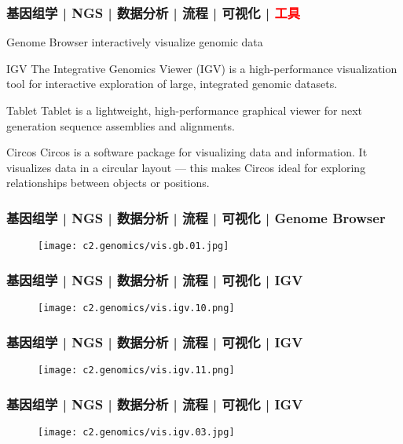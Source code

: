 \begin{frame}
  \frametitle{基因组学 | NGS | 数据分析 | 流程 | 可视化 | \textcolor{red}{工具}}
  \begin{block}{Genome Browser}
    interactively visualize genomic data
  \end{block}
  \pause
  \begin{block}{IGV}
    The Integrative Genomics Viewer (IGV) is a high-performance visualization tool for interactive exploration of large, integrated genomic datasets.
  \end{block}
  \pause
  \begin{block}{Tablet}
    Tablet is a lightweight, high-performance graphical viewer for next generation sequence assemblies and alignments.
  \end{block}
  \pause
  \begin{block}{Circos}
    Circos is a software package for visualizing data and information. It visualizes data in a circular layout --- this makes Circos ideal for exploring relationships between objects or positions.
  \end{block}
\end{frame}

\begin{frame}
  \frametitle{基因组学 | NGS | 数据分析 | 流程 | 可视化 | Genome Browser}
  \begin{figure}
    \centering
    \texttt{[image: c2.genomics/vis.gb.01.jpg]}
  \end{figure}
\end{frame}

\begin{frame}
  \frametitle{基因组学 | NGS | 数据分析 | 流程 | 可视化 | IGV}
  \begin{figure}
    \centering
    \texttt{[image: c2.genomics/vis.igv.10.png]}
  \end{figure}
\end{frame}

\begin{frame}
  \frametitle{基因组学 | NGS | 数据分析 | 流程 | 可视化 | IGV}
  \begin{figure}
    \centering
    \texttt{[image: c2.genomics/vis.igv.11.png]}
  \end{figure}
\end{frame}

\begin{frame}
  \frametitle{基因组学 | NGS | 数据分析 | 流程 | 可视化 | IGV}
  \begin{figure}
    \centering
    \texttt{[image: c2.genomics/vis.igv.03.jpg]}
  \end{figure}
\end{frame}

